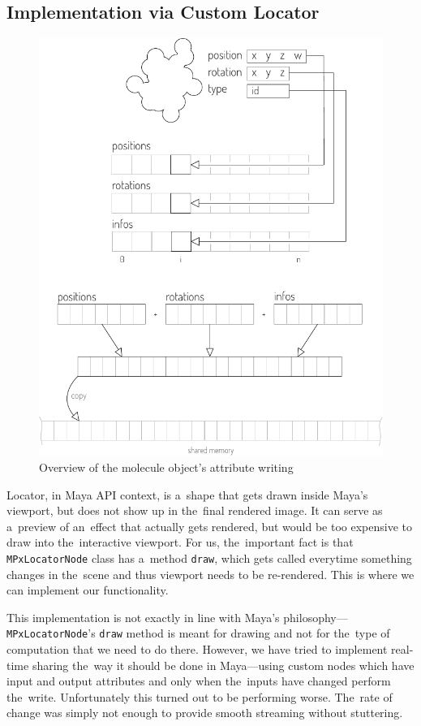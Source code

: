 \documentclass[
  digital, %
  table,   %
  nolof,     %
  nolot,     %
  oneside,
]{fithesis3}
\begin{document}
\subsection{Implementation via Custom Locator}
\begin{figure}
  \centering
  \includegraphics[scale=1.0]{images/attr-writing-high-layout.pdf}
  \caption{Overview of the molecule object's attribute writing}
  \label{fig:attribute-writing}
\end{figure}

Locator, in Maya API context, is a shape that gets drawn inside Maya's viewport, but does not show up in the final rendered image. It can serve as a preview of an effect that actually gets rendered, but would be too expensive to draw into the interactive viewport. For us, the important fact is that \texttt{MPxLocatorNode} class has a method \texttt{draw}, which gets called everytime something changes in the scene and thus viewport needs to be re-rendered. This is where we can implement our functionality.

This implementation is not exactly in line with Maya's philosophy—\texttt{MPxLocatorNode}'s \texttt{draw} method is meant for drawing and not for the type of computation that we need to do there. However, we have tried to implement real-time sharing the way it should be done in Maya—using custom nodes which have input and output attributes and only when the inputs have changed perform the write. Unfortunately this turned out to be performing worse. The rate of change was simply not enough to provide smooth streaming without stuttering.
\end{document}
